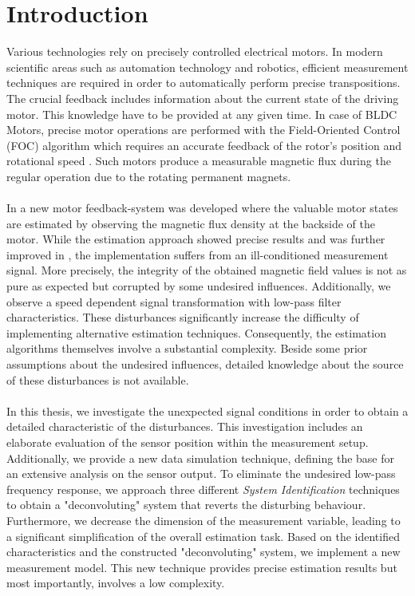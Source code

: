 \documentclass[english]{isasthesis}
\begin{document}
    \chapter{Introduction}\label{introduction}
    Various technologies rely on precisely controlled electrical motors. In modern scientific areas such as automation technology and robotics, efficient measurement techniques are required in order to automatically perform precise transpositions. The crucial feedback includes information about the current state of the driving motor. This knowledge have to be provided at any given time. In case of BLDC Motors, precise motor operations are performed with the Field-Oriented Control
(FOC) algorithm which requires an accurate feedback of the rotor's position and rotational speed \cite{lee2009comparison}. Such motors produce a measurable magnetic flux during the regular operation due to the rotating permanent magnets. \\ \\
    In \cite{fabian} a new motor feedback-system was developed where the valuable motor states are estimated by observing the magnetic flux density at the backside of the motor. While the estimation approach showed precise results and was further improved in \cite{mariana}, the implementation suffers from an ill-conditioned measurement signal. More precisely, the integrity of the obtained magnetic field values is not as pure as expected but corrupted by some undesired influences. Additionally, we observe a speed dependent signal transformation with low-pass filter characteristics. These disturbances significantly increase the difficulty of implementing alternative estimation techniques. Consequently, the estimation algorithms themselves involve a substantial complexity. Beside some prior assumptions about the undesired influences, detailed knowledge about the source of these disturbances is not available.\\\\
    In this thesis, we investigate the unexpected signal conditions in order to obtain a detailed characteristic of the disturbances. This investigation includes an elaborate evaluation of the sensor position within the measurement setup. Additionally, we provide a new data simulation technique, defining the base for an extensive analysis on the sensor output. To eliminate the undesired low-pass frequency response, we approach three different \textit{System Identification} techniques to obtain a "deconvoluting" system that reverts the disturbing behaviour. Furthermore, we decrease the dimension of the measurement variable, leading to a significant simplification of the overall estimation task. Based on the identified characteristics and the constructed "deconvoluting" system, we implement a new measurement model. This new technique provides precise estimation results but most importantly, involves a low complexity.\\ \\
\end{document}
